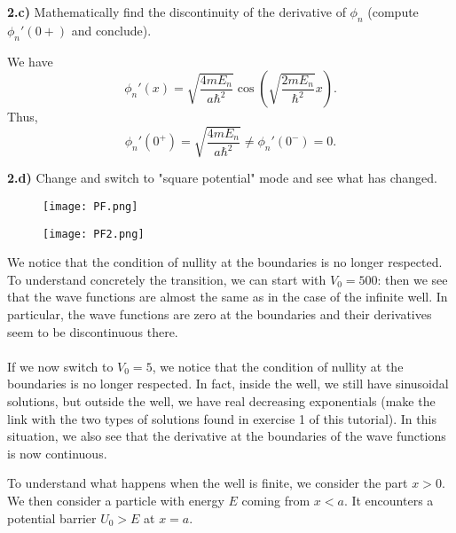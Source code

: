 \medskip

\noindent \textbf{2.c)} Mathematically find the discontinuity of the derivative of $\phi_n$ (compute $\phi_n'(0+)$ and conclude).\\

\begin{breakbox}
    \noindent We have $$\phi_n'(x) = \sqrt{\frac{4mE_n}{a\hbar^2}}\cos\left(\sqrt{\frac{2mE_n}{\hbar^2}}x\right).$$ 
    \noindent Thus,
    $$\boxed{\phi_n'(0^+) = \sqrt{\frac{4mE_n}{a\hbar^2}} \neq \phi_n'(0^-) = 0.}$$    
\end{breakbox}

\medskip

\noindent \textbf{2.d)} Change and switch to "square potential" mode and see what has changed.\\

\begin{figure}[H]
    \centering
    \texttt{[image: PF.png]}
    \label{fig:enter-label}
\end{figure}

\begin{figure}[H]
    \centering
    \texttt{[image: PF2.png]}
    \label{fig:enter-label}
\end{figure}

\begin{breakbox}
    \noindent We notice that the condition of nullity at the boundaries is no longer respected. To understand concretely the transition, we can start with $V_0 = 500$: then we see that the wave functions are almost the same as in the case of the infinite well. In particular, the wave functions are zero at the boundaries and their derivatives seem to be discontinuous there. \\ \\
    If we now switch to $V_0 = 5$, we notice that the condition of nullity at the boundaries is no longer respected. In fact, inside the well, we still have sinusoidal solutions, but outside the well, we have real decreasing exponentials (make the link with the two types of solutions found in exercise 1 of this tutorial). In this situation, we also see that the derivative at the boundaries of the wave functions is now continuous.    
\end{breakbox}

\medskip

\medskip

\noindent To understand what happens when the well is finite, we consider the part $x>0$. We then consider a particle with energy $E$ coming from $x<a$. It encounters a potential barrier $U_0>E$ at $x=a$.\\

